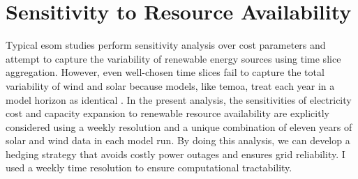 \begin{table}[H]
  \centering
  \caption{Relative Difference in Total Capacity [\%]}
  \label{tab:relative_error}
\end{table}

\section{Sensitivity to Resource Availability}
\label{section:resource_sa}

Typical \gls{esom} studies perform sensitivity analysis over cost parameters and
attempt to capture the variability of renewable energy sources using time slice
aggregation. However, even well-chosen time slices fail to capture the total variability
of wind and solar because models, like \gls{temoa}, treat each year in a model
horizon as identical \cite{hunter_modeling_2013}. In the present analysis, the
sensitivities of electricity cost and capacity expansion to renewable resource
availability are explicitly considered using a weekly resolution and a unique combination
of eleven years of solar and wind data in each model run. By doing this analysis,
we can develop a hedging strategy that avoids costly power outages and ensures
grid reliability. I used a weekly time resolution to ensure computational tractability.

